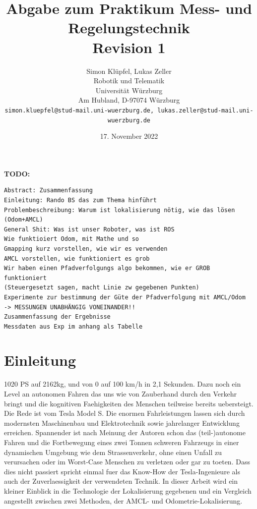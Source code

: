 \documentclass[11pt,a4paper]{article}
\begin{document}
\title{\Large\bf Abgabe zum Praktikum Mess- und Regelungstechnik \\ \textbf{Revision 1}}

\author{Simon Klüpfel, Lukas Zeller\\
  Robotik und Telematik \\
  Universität Würzburg\\
  Am Hubland, D-97074 Würzburg\\
{\small \texttt{simon.kluepfel@stud-mail.uni-wuerzburg.de, lukas.zeller@stud-mail.uni-wuerzburg.de}}
}
\date{17. November 2022}

\maketitle

\textbf{TODO:}
\begin{verbatim}
Abstract: Zusammenfassung
Einleitung: Rando BS das zum Thema hinführt
Problembeschreibung: Warum ist lokalisierung nötig, wie das lösen (Odom+AMCL)
General Shit: Was ist unser Roboter, was ist ROS
Wie funktioiert Odom, mit Mathe und so
Gmapping kurz vorstellen, wie wir es verwenden
AMCL vorstellen, wie funktioniert es grob
Wir haben einen Pfadverfolgungs algo bekommen, wie er GROB funktioniert 
(Steuergesetzt sagen, macht Linie zw gegebenen Punkten)
Experimente zur bestimmung der Güte der Pfadverfolgung mit AMCL/Odom 
-> MESSUNGEN UNABHÄNGIG VONEINANDER!!
Zusammenfassung der Ergebnisse
Messdaten aus Exp im anhang als Tabelle
\end{verbatim}
\section{Einleitung}
1020 PS auf 2162kg, und von 0 auf 100 km/h in 2,1 Sekunden\footnotemark[1]. Dazu noch ein Level an autonomen Fahren das uns wie von Zauberhand durch den Verkehr bringt
und die kognitiven Faehigkeiten des Menschen teilweise bereits uebersteigt. Die Rede ist vom Tesla Model S. Die enormen Fahrleistungen lassen sich durch modernsten Maschinenbau und Elektrotechnik 
sowie jahrelanger Entwicklung erreichen. Spannender ist nach Meinung der Autoren schon das (teil-)autonome Fahren und die Fortbewegung eines 
zwei Tonnen schweren Fahrzeugs in einer dynamischen Umgebung wie dem Strassenverkehr, ohne einen Unfall zu verursachen oder im Worst-Case Menschen zu verletzen oder gar zu toeten.
Dass dies nicht passiert spricht einmal fuer das Know-How der Tesla-Ingenieure als auch der Zuverlaessigkeit der verwendeten Technik. In dieser Arbeit wird 
ein kleiner Einblick in die Technologie der Lokalisierung gegebenen und ein Vergleich angestellt zwischen zwei Methoden, der AMCL- und Odometrie-Lokalisierung.
\end{document}
